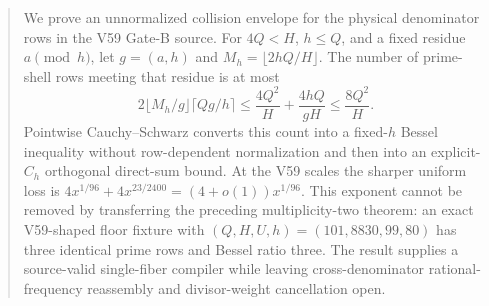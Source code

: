\begin{abstract}
We prove an unnormalized collision envelope for the physical denominator rows in the
V59 Gate-B source.  For $4Q<H$, $h\le Q$, and a fixed residue $a\pmod h$, let
$g=(a,h)$ and $M_h=\lfloor2hQ/H\rfloor$.  The number of prime-shell rows meeting that
residue is at most
\[
 2\lfloor M_h/g\rfloor\lceil Qg/h\rceil
 \le \frac{4Q^2}{H}+\frac{4hQ}{gH}
 \le \frac{8Q^2}{H}.
\]
Pointwise Cauchy--Schwarz converts this count into a fixed-$h$ Bessel inequality without
row-dependent normalization and then into an explicit-$C_h$ orthogonal direct-sum
bound.  At the V59 scales the sharper uniform loss is
$4x^{1/96}+4x^{23/2400}=(4+o(1))x^{1/96}$.  This exponent cannot be removed by
transferring the preceding multiplicity-two theorem: an exact V59-shaped floor fixture
with $(Q,H,U,h)=(101,8830,99,80)$ has three identical prime rows and Bessel ratio
three.  The result supplies a source-valid single-fiber compiler while leaving
cross-denominator rational-frequency reassembly and divisor-weight cancellation open.
\end{abstract}
